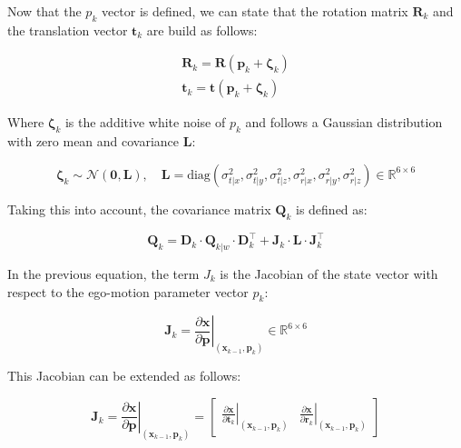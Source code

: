Now that the $p_k$ vector is defined, we can state that the rotation matrix $\mathbf{R}_k$ and the translation vector $\mathbf{t}_k$ are build as follows:

\begin{align}
  \mathbf{R}_k = \mathbf{R}(\mathbf{p}_k + \boldsymbol{\zeta}_k) \\
  \mathbf{t}_k = \mathbf{t}(\mathbf{p}_k + \boldsymbol{\zeta}_k)
\end{align}

Where $\boldsymbol{\zeta}_k$ is the additive white noise of $p_k$ and follows a Gaussian distribution with zero mean and covariance $\mathbf{L}$:

\begin{equation}
  \boldsymbol{\zeta}_k \sim \mathcal{N}(\mathbf{0}, \mathbf{L}), \quad \mathbf{L} = \text{diag}(\sigma^2_{t|x}, \sigma^2_{t|y}, \sigma^2_{t|z}, \sigma^2_{r|x}, \sigma^2_{r|y}, \sigma^2_{r|z}) \in \mathbb{R}^{6 \times 6}
\end{equation}

Taking this into account, the covariance matrix $\mathbf{Q}_k$ is defined as:

\begin{equation}
  \mathbf{Q}_k = \mathbf{D}_k \cdot \mathbf{Q}_{k|w} \cdot \mathbf{D}_k^\top + \mathbf{J}_k \cdot \mathbf{L} \cdot \mathbf{J}_k^\top
\end{equation}

In the previous equation, the term $J_k$ is the Jacobian of the state vector with respect to the ego-motion parameter vector $p_k$:

\begin{equation}
  \mathbf{J}_k = \left. \frac{\partial \mathbf{x}}{\partial \mathbf{p}} \right|_{(\mathbf{x}_{k-1}, \mathbf{p}_k)} \in \mathbb{R}^{6 \times 6}
\end{equation}
  
This Jacobian can be extended as follows:

\begin{equation}
  \mathbf{J}_k = \left. \frac{\partial \mathbf{x}}{\partial \mathbf{p}} \right|_{(\mathbf{x}_{k-1}, \mathbf{p}_k)} =
  \begin{bmatrix}
    \left. \frac{\partial \mathbf{x}}{\partial \mathbf{t}_k} \right|_{(\mathbf{x}_{k-1}, \mathbf{p}_k)} & \left. \frac{\partial \mathbf{x}}{\partial \mathbf{r}_k}  \right|_{(\mathbf{x}_{k-1}, \mathbf{p}_k)} 
  \end{bmatrix}
\end{equation}


